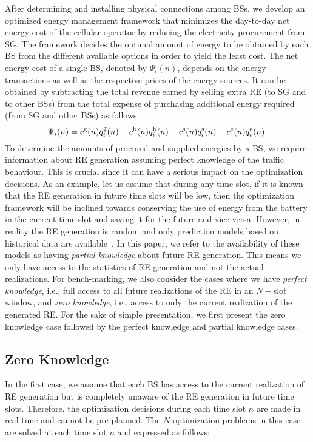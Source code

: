 \documentclass[10pt, letter,twocolumn]{IEEEtran}
\begin{document}
After determining and installing physical connections among BSs, we develop an optimized energy management framework that minimizes the day-to-day net energy cost of the cellular operator by reducing the electricity procurement from SG. The framework decides the optimal amount of energy to be obtained by each BS from the different available options in order to yield the least cost. The net energy cost of a single BS, denoted by $\Psi_{i}(n)$, depends on the energy transactions as well as the respective prices of the energy sources. It can be obtained by subtracting the total revenue earned by selling extra RE (to SG and to other BSs) from the total expense of purchasing additional energy required (from SG and other BSs) as follows:
\begin{equation}\label{cost_energy}
\small
  \Psi_{i}(n) = c^{\text{g}}(n) q_{i}^{\text{g}}(n) + c^{\text{b}}(n) q_{i}^{\text{b}}(n) - c^{\text{s}}(n) q_{i}^{\text{s}}(n) - c^{\text{e}}(n) q_{i}^{\text{e}}(n).
\end{equation}
To determine the amounts of procured and supplied energies by a BS, we require information about RE generation assuming perfect knowledge of the traffic behaviour. This is crucial since it can have a serious impact on the optimization decisions. As an example, let us assume that during any time slot, if it is known that the RE generation in future time slots will be low, then the optimization framework will be inclined towards conserving the use of energy from the battery in the current time slot and saving it for the future and vice versa. However, in reality the RE generation is random and only prediction models based on historical data are available~\cite{solar_generation}. In this paper, we refer to the availability of these models as having \emph{partial knowledge} about future RE generation. This means we only have access to the statistics of RE generation and not the actual realizations. For bench-marking, we also consider the cases where we have \emph{perfect knowledge}, i.e., full access to all future realizations of the RE in an $N-$slot window, and \emph{zero knowledge}, i.e., access to only the current realization of the generated RE. For the sake of simple presentation, we first present the zero knowledge case followed by the perfect knowledge and partial knowledge cases.

\vspace{-0.0cm}
\subsection{Zero Knowledge}\vspace{-0.0cm}
In the first case, we assume that each BS has access to the current realization of RE generation but is completely unaware of the RE generation in future time slots. Therefore, the optimization decisions during each time slot $n$ are made in real-time and cannot be pre-planned. The $N$ optimization problems in this case are solved at each time slot $n$ and expressed as follows:
\end{document}
